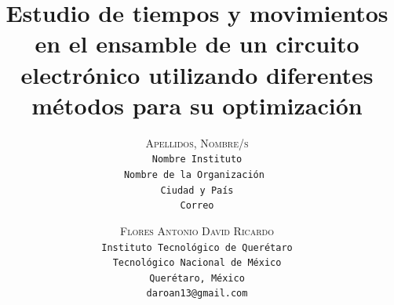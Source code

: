     \lfoot{ \thepage}
    
    \setlength{\droptitle}{-5\baselineskip} %
    \title{\textbf{Estudio de tiempos y movimientos en el ensamble de un circuito electrónico utilizando diferentes métodos para su optimización }} %
    
     \author{ 
     \textsc{Apellidos, Nombre/s}\\ 
     \texttt{ Nombre Instituto } \\ 
     \texttt{Nombre de la Organización } \\ 
     \texttt{Ciudad y País}\\ 
     \texttt{Correo} 
     \and 
     \textsc{Flores Antonio David Ricardo}\\ 
     \texttt{ Instituto Tecnológico de Querétaro } \\ 
     \texttt{ Tecnológico Nacional de México } \\ 
     \texttt{Querétaro, México}\\ 
     \texttt{daroan13@gmail.com} 
    }
    
    
    
    
    \maketitle
    \thispagestyle{fancy}
    
